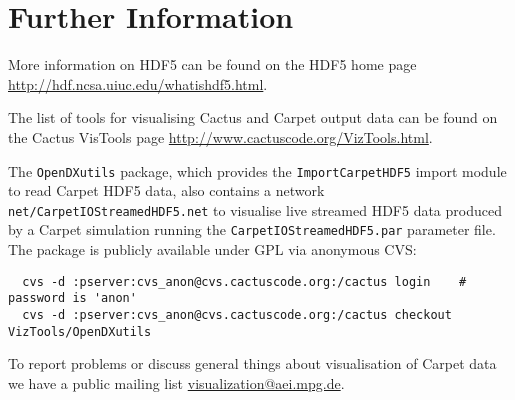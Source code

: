 \documentclass{article}
\begin{document}
\section{Further Information}

More information on HDF5 can be found on the HDF5 home page
\url{http://hdf.ncsa.uiuc.edu/whatishdf5.html}.

The list of tools for visualising Cactus and Carpet output data can be found
on the Cactus VisTools page \url{http://www.cactuscode.org/VizTools.html}.

The {\tt OpenDXutils} package, which provides the {\tt ImportCarpetHDF5} import
module to read Carpet HDF5 data, also contains a network {\tt
net/CarpetIOStreamedHDF5.net} to visualise live streamed HDF5 data produced
by a Carpet simulation running the {\tt CarpetIOStreamedHDF5.par} parameter
file. The package is publicly available under GPL via anonymous CVS:
\begin{verbatim}
  cvs -d :pserver:cvs_anon@cvs.cactuscode.org:/cactus login    # password is 'anon'
  cvs -d :pserver:cvs_anon@cvs.cactuscode.org:/cactus checkout VizTools/OpenDXutils
\end{verbatim}

To report problems or discuss general things about visualisation of Carpet data
we have a public mailing list \url{visualization@aei.mpg.de}.

\end{document}
